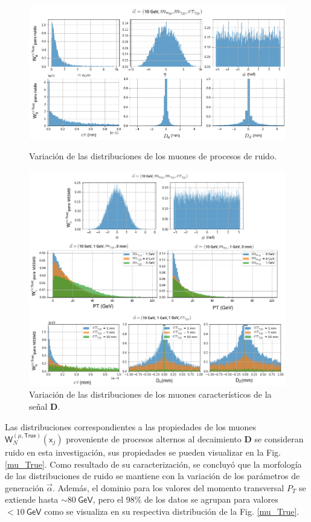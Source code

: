 \begin{figure}[!t]
\centering
\includegraphics[width=.9\textwidth]{Cap4/imagenes/propiedades_True_notMSSM.png}
\caption{Variación de las distribuciones de los muones de procesos de ruido.}
\label{mu_True}

\includegraphics[width=.9\textwidth]{Cap4/imagenes/propiedades_True_MSSM.png}
\caption{Variación de las distribuciones de los muones característicos de la señal \MSSM\textbf{D}.}
\label{mu_True2}
\end{figure}

Las distribuciones correspondientes a las propiedades de los muones $\textsf{W}^{(\mu,\textsf{True})}_N (\textsf{x}_j)$ proveniente de procesos alternos al decaimiento  \MSSM\textbf{D} se consideran ruido en esta investigación, sus propiedades se pueden visualizar en la Fig. \ref{mu_True}. Como resultado de su caracterización, se concluyó que la morfología de las distribuciones de ruido se mantiene con la variación de los parámetros de generación $\vec{\alpha}$. Además, el dominio para los valores del momento transversal $P_T$ se extiende hasta $\sim 80~ \textsf{GeV}$, pero el 98\% de los datos se agrupan para valores $<10~\textsf{GeV}$ como se visualiza en su respectiva distribución de la Fig. \ref{mu_True}.



